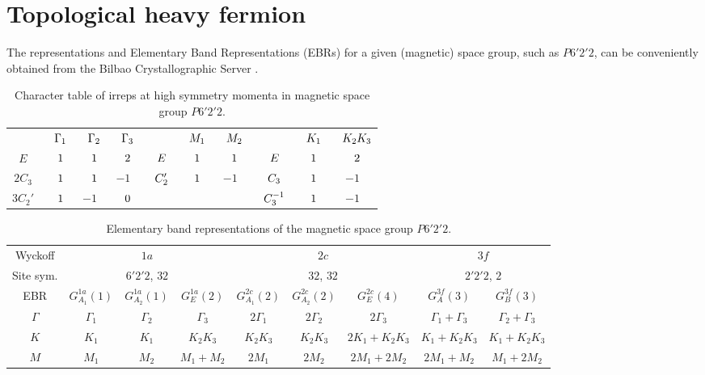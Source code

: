 %
%


\chapter{Topological heavy fermion}

The representations and Elementary Band Representations (EBRs) for a given (magnetic) space group, such as \( P6'2'2 \), can be conveniently obtained from the Bilbao Crystallographic Server \cite{bilbao_1, bilbao_2}.

\begin{table}[H]
\caption{Character table of irreps at high symmetry momenta in magnetic space group $P6'2'2$.}
\centering
\begin{tabular} { c c c c | c c c | c c c }
\cline{1-10}
$\P$ & $\P \Gamma_1$ & $\P \Gamma_2$ & $\P \Gamma_3$ & $\P$ & $\P M_1$ & $\P M_2$ & $\P$ & $\P K_1$ & $\P K_2K_3$ \\
\cline{1-10}
$E$ & $\P1$ & $\P1$ & $\P2$ & $\P E$ & $\P1$ & $\P1$ & $\P E$ & $\P1$ & $\P2$ \\
$2 C_3$ & $\P1$ & $\P1$ & $ -1$ & $\P C_2'$ & $\P1$ & $ -1$ & $\P C_3$ & $\P1$ & $ -1$ \\
$3 C_2'$ & $\P1$ & $ -1$ & $\P0$ & $\P$ & $\P$ & $\P$ & $\P C_3^{-1}$ & $\P1$ & $-1$ \\
\cline{1-10}
\end{tabular}
\label{tab:P6'2'2}
\end{table}

\begin{table}[H]
\footnotesize
\caption{Elementary band representations of the magnetic space group $P6'2'2$.}
\centering
\begin{tabular}{|c|c|c|c|c|c|c|c|c|}
\hline
Wyckoff & \multicolumn{3}{c|}{$1a$} & \multicolumn{3}{c|}{$2c$} & \multicolumn{2}{c|}{$3f$} \\
\cline{1-9}
Site sym. & \multicolumn{3}{c|}{$6'2'2$, $32$} & \multicolumn{3}{c|}{$32$, $32$} & \multicolumn{2}{c|}{$2'2'2$, $2$} \\
\cline{1-9}
EBR & $G_{A_1}^{1a}(1)$ & $G_{A_2}^{1a}(1)$ & $G_{E}^{1a}(2)$ & $G_{A_1}^{2c}(2)$ & $G_{A_2}^{2c}(2)$ & $G_{E}^{2c}(4)$   & $G_{A}^{3f}(3)$ & $G_{B}^{3f}(3)$ \\
\hline
$\Gamma$ & $\Gamma_1$ & $\Gamma_2$ & $\Gamma_3$ & $2\Gamma_1$ & $2\Gamma_2$ & $2\Gamma_3$ & $\Gamma_1+\Gamma_3$ & $\Gamma_2+\Gamma_3$ \\
\hline
$K$ & $K_1$ & $K_1$ & $K_2 K_3$ & $K_2 K_3$ & $K_2 K_3$ & $2K_1 + K_2 K_3$ & $K_1+K_2 K_3$ & $K_1+K_2 K_3$ \\
\hline
$M$ & $M_1$ & $M_2$ & $M_1+M_2$ & $2M_1$ & $2M_2$ & $2M_1+2M_2$ & $2M_1+M_2$ & $M_1+2M_2$ \\
\hline
\end{tabular}
\label{tab:matbg-irreps}
\end{table}

